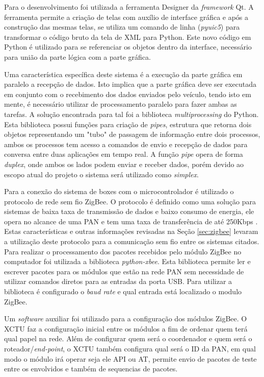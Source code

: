 Para o desenvolvimento foi utilizada a ferramenta Designer da \textit{framework} Qt. A ferramenta permite a criação de telas com auxílio de interface gráfica e após a construção das mesmas telas, se utiliza um comando de linha (\textit{pyuic5}) para transformar o código bruto da tela de XML para Python. Este novo código em Python é utilizado para se referenciar os objetos dentro da interface, necessário para união da parte lógica com a parte gráfica.

Uma característica específica deste sistema é a execução da parte gráfica em paralelo a recepção de dados. Isto implica que a parte gráfica deve ser executada em conjunto com o recebimento dos dados enviados pelo veículo, tendo isto em mente, é necessário utilizar de processamento paralelo para fazer ambas as tarefas. A solução encontrada para tal foi a biblioteca \textit{multiprocessing} do Python. Esta biblioteca possui funções para criação de \textit{pipes}, estrutura que retorna dois objetos representando um "tubo" de passagem de informação entre dois processos, ambos os processos tem acesso a comandos de envio e recepção de dados para conversa entre duas aplicações em tempo real. A função \textit{pipe} opera de forma \textit{duplex}, onde ambos os lados podem enviar e receber dados, porém devido ao escopo atual do projeto o sistema será utilizado como \textit{simplex}.    

Para a conexão do sistema de boxes com o microcontrolador é utilizado o protocolo de rede sem fio ZigBee. O protocolo é definido como uma solução para sistemas de baixa taxa de transmissão de dados e baixo consumo de energia, ele opera no alcance de uma PAN e tem uma taxa de transferência de até 250Kbps \cite{elahi2009zigbee}. Estas características e outras informações revisadas na Seção \ref{sec:zigbee} levaram a utilização deste protocolo para a comunicação sem fio entre os sistemas citados. Para realizar o processamento dos pacotes recebidos pelo módulo ZigBee no computador foi utilizada a biblioteca \textit{python-xbee}. Esta biblioteca permite ler e escrever pacotes para os módulos que estão na rede PAN sem necessidade de utilizar comandos diretos para as entradas da porta USB. Para utilizar a biblioteca é configurado o \textit{baud rate} e qual entrada está localizado o modulo ZigBee. 

Um \textit{software} auxiliar foi utilizado para a configuração dos módulos ZigBee. O XCTU\cite{xctu} faz a configuração inicial entre os módulos a fim de ordenar quem terá qual papel na rede. Além de configurar quem será o coordenador e quem será o roteador/\textit{end-point}, o XCTU também configura qual será o ID da PAN, em qual modo o módulo irá operar seja ele API ou AT, permite envio de pacotes de teste entre os envolvidos e também de sequencias de pacotes. 

